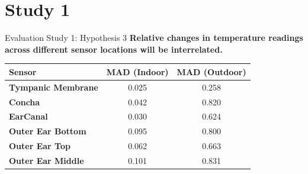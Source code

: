 \documentclass[en]{sdqbeamer}
\begin{document}
\section{Study 1}
\begin{frame}{Evaluation Study 1: Hypothesis 3}
    \textbf{Relative changes in temperature readings across different sensor locations will be interrelated.}
    \vspace*{10pt}
    \begin{center}
        \begin{tabularx}{\textwidth}{|X|c|c|}
            \hline
            \textbf{Sensor} & \textbf{MAD (Indoor)} & \textbf{MAD (Outdoor)} \\
            \hline
            \textbf{Tympanic Membrane} & 0.025 & 0.258 \\
            \textbf{Concha} & 0.042 & 0.820 \\
            \textbf{EarCanal} & 0.030 & 0.624 \\
            \textbf{Outer Ear Bottom} & 0.095 & 0.800 \\
            \textbf{Outer Ear Top} & 0.062 & 0.663 \\
            \textbf{Outer Ear Middle} & 0.101 & 0.831 \\
            \hline
        \end{tabularx}    
    \end{center}
\end{frame}
\end{document}
